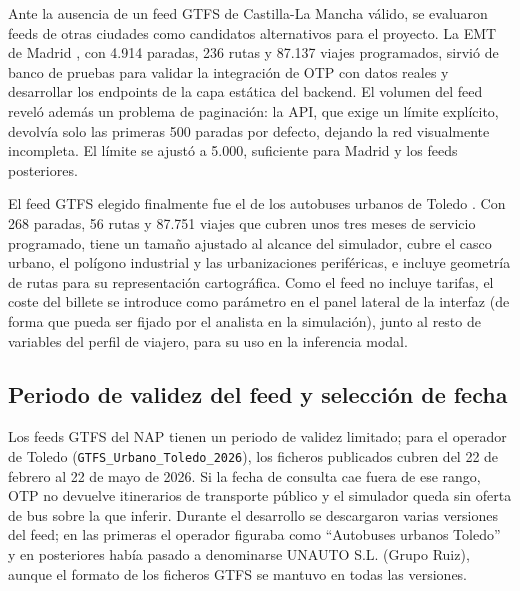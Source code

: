 Ante la ausencia de un feed GTFS de Castilla-La Mancha válido, se evaluaron feeds de otras ciudades como candidatos alternativos para el proyecto. La EMT de Madrid \cite{NAPEMTMadrid}, con 4.914 paradas, 236 rutas y 87.137 viajes programados, sirvió de banco de pruebas para validar la integración de OTP con datos reales y desarrollar los endpoints de la capa estática del backend. El volumen del feed reveló además un problema de paginación: la API, que exige un límite explícito, devolvía solo las primeras 500 paradas por defecto, dejando la red visualmente incompleta. El límite se ajustó a 5.000, suficiente para Madrid y los feeds posteriores.

El feed GTFS elegido finalmente fue el de los autobuses urbanos de Toledo \cite{NAPToledoUrbano}. Con 268 paradas, 56 rutas y 87.751 viajes que cubren unos tres meses de servicio programado, tiene un tamaño ajustado al alcance del simulador, cubre el casco urbano, el polígono industrial y las urbanizaciones periféricas, e incluye geometría de rutas para su representación cartográfica. Como el feed no incluye tarifas, el coste del billete se introduce como parámetro en el panel lateral de la interfaz (de forma que pueda ser fijado por el analista en la simulación), junto al resto de variables del perfil de viajero, para su uso en la inferencia modal.

\subsection{Periodo de validez del feed y selección de fecha}
\label{subsec:impl_otp_fecha}

Los feeds GTFS del NAP tienen un periodo de validez limitado; para el operador de Toledo (\texttt{GTFS\_Urbano\_Toledo\_2026}), los ficheros publicados cubren del 22 de febrero al 22 de mayo de 2026. Si la fecha de consulta cae fuera de ese rango, OTP no devuelve itinerarios de transporte público y el simulador queda sin oferta de bus sobre la que inferir. Durante el desarrollo se descargaron varias versiones del feed; en las primeras el operador figuraba como ``Autobuses urbanos Toledo'' y en posteriores había pasado a denominarse UNAUTO S.L. (Grupo Ruiz), aunque el formato de los ficheros GTFS se mantuvo en todas las versiones.

